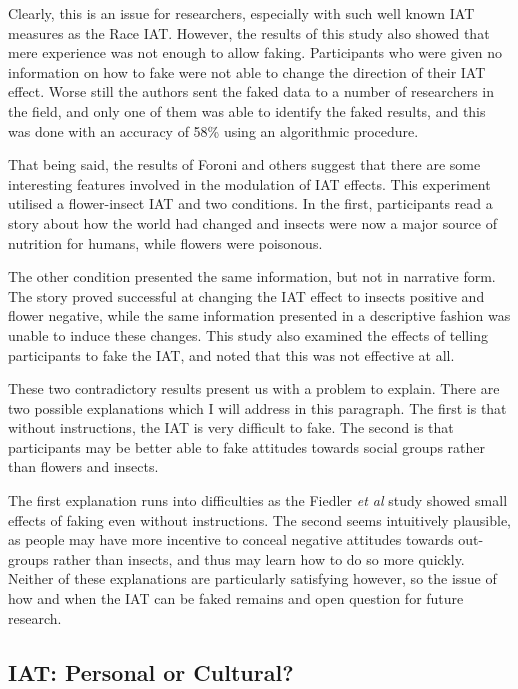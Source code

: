 Clearly, this is an issue for researchers, especially with such well known IAT measures as the Race IAT. However, the results of this study also showed that mere experience was not enough to allow faking. Participants who were given no information on how to fake were not able to change the direction of their IAT effect. Worse still the authors sent the faked data to a number of researchers in the field, and only one of them was able to identify the faked results, and this was done with an accuracy of 58\% using an algorithmic procedure.   

That being said, the results of Foroni and others \cite{Foroni2005}  suggest that there are some interesting features involved in the modulation of IAT effects. This experiment utilised a flower-insect IAT \cite{Greenwald1998} and two conditions. In the first, participants read a story about how the world had changed and insects were now a major source of nutrition for humans, while flowers were poisonous. 

The other condition presented the same information, but not in narrative form. The story proved successful at changing the IAT effect to insects positive and flower negative, while the same information presented in a descriptive fashion was unable to induce these changes. This study also examined the effects of telling participants to fake the IAT, and noted that this was not effective at all. 

These two contradictory results present us with a problem to explain. There are two possible explanations which I will address in this paragraph. The first is that without instructions, the IAT is very difficult to fake. The second is that participants may be better able to fake attitudes towards social groups rather than flowers and insects. 

The first explanation runs into difficulties as the Fiedler \textit{et al}  study showed small effects of faking even without instructions. The second seems intuitively plausible, as people may have more incentive to conceal negative attitudes towards out-groups rather than insects, and thus may learn how to do so more quickly. Neither of these explanations are particularly satisfying however, so the issue of how and when the IAT can be faked remains and open question for future research. 

 


\subsection{IAT: Personal or Cultural?}
\label{sec:iat:-personal-or}


